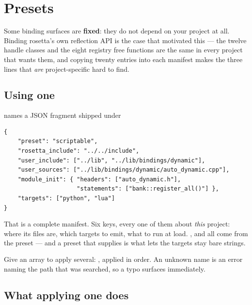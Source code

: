 \chapter{Presets}
\label{ch:presets}

Some binding surfaces are \textbf{fixed}: they do not depend on your project at
all. Binding rosetta's own reflection API is the case that motivated this ---
the twelve  handle classes and the eight registry free
functions are the same in every project that wants them, and copying twenty
entries into each manifest makes the three lines that \emph{are}
project-specific hard to find.

\section{Using one}

 names a JSON fragment shipped under

\begin{center}
\end{center}

\begin{lstlisting}[style=json]
{
    "preset": "scriptable",
    "rosetta_include": "../../include",
    "user_include": ["../lib", "../lib/bindings/dynamic"],
    "user_sources": ["../lib/bindings/dynamic/auto_dynamic.cpp"],
    "module_init": { "headers": ["auto_dynamic.h"],
                     "statements": ["bank::register_all()"] },
    "targets": ["python", "lua"]
}
\end{lstlisting}

That is a complete manifest. Six keys, every one of them about \emph{this}
project: where its files are, which targets to emit, what to run at load.
,  and  all come from the
preset --- and a preset that supplies  is what lets the
targets stay bare strings.

Give an array to apply several: ,
applied in order. An unknown name is an error naming the path that was searched,
so a typo surfaces immediately.

\section{What applying one does}

